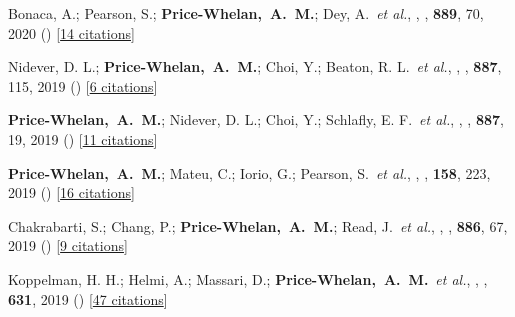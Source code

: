 \item[{\color{deemph}\scriptsize59}]Bonaca, A.; Pearson, S.; \textbf{Price-Whelan,~A.~M.}; Dey, A.~\textit{et al.}, , \apj, \textbf{889}, 70, 2020 () [\href{http://adsabs.harvard.edu/abs/2020ApJ...889...70B}{14 citations}]

\item[{\color{deemph}\scriptsize58}]Nidever, D. L.; \textbf{Price-Whelan,~A.~M.}; Choi, Y.; Beaton, R. L.~\textit{et al.}, , \apj, \textbf{887}, 115, 2019 () [\href{http://adsabs.harvard.edu/abs/2019ApJ...887..115N}{6 citations}]

\item[{\color{deemph}\scriptsize57}]\textbf{Price-Whelan,~A.~M.}; Nidever, D. L.; Choi, Y.; Schlafly, E. F.~\textit{et al.}, , \apj, \textbf{887}, 19, 2019 () [\href{http://adsabs.harvard.edu/abs/2019ApJ...887...19P}{11 citations}]

\item[{\color{deemph}\scriptsize56}]\textbf{Price-Whelan,~A.~M.}; Mateu, C.; Iorio, G.; Pearson, S.~\textit{et al.}, , \aj, \textbf{158}, 223, 2019 () [\href{http://adsabs.harvard.edu/abs/2019AJ....158..223P}{16 citations}]

\item[{\color{deemph}\scriptsize55}]Chakrabarti, S.; Chang, P.; \textbf{Price-Whelan,~A.~M.}; Read, J.~\textit{et al.}, , \apj, \textbf{886}, 67, 2019 () [\href{http://adsabs.harvard.edu/abs/2019ApJ...886...67C}{9 citations}]

\item[{\color{deemph}\scriptsize54}]Koppelman, H. H.; Helmi, A.; Massari, D.; \textbf{Price-Whelan,~A.~M.}~\textit{et al.}, , \aanda, \textbf{631}, 2019 () [\href{http://adsabs.harvard.edu/abs/2019A&A...631L...9K}{47 citations}]

